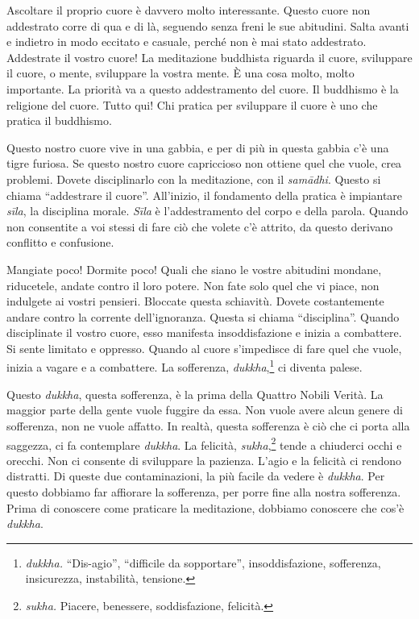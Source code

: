 Ascoltare il proprio cuore è davvero molto interessante. Questo cuore
non addestrato corre di qua e di là, seguendo senza freni le sue
abitudini. Salta avanti e indietro in modo eccitato e casuale, perché
non è mai stato addestrato. Addestrate il vostro cuore! La meditazione
buddhista riguarda il cuore, sviluppare il cuore, o mente, sviluppare la
vostra mente. È una cosa molto, molto importante. La priorità va a
questo addestramento del cuore. Il buddhismo è la religione del cuore.
Tutto qui! Chi pratica per sviluppare il cuore è uno che pratica il
buddhismo.

Questo nostro cuore vive in una gabbia, e per di più in questa gabbia
c'è una tigre furiosa. Se questo nostro cuore capriccioso non ottiene
quel che vuole, crea problemi. Dovete disciplinarlo con la meditazione,
con il \emph{samādhi}. Questo si chiama ``addestrare il cuore''.
All'inizio, il fondamento della pratica è impiantare \emph{sīla}, la
disciplina morale. \emph{Sīla} è l'addestramento del corpo e della
parola. Quando non consentite a voi stessi di fare ciò che volete c'è
attrito, da questo derivano conflitto e confusione.

Mangiate poco! Dormite poco! Quali che siano le vostre abitudini
mondane, riducetele, andate contro il loro potere. Non fate solo quel
che vi piace, non indulgete ai vostri pensieri. Bloccate questa
schiavitù. Dovete costantemente andare contro la corrente
dell'ignoranza. Questa si chiama ``disciplina''. Quando disciplinate il
vostro cuore, esso manifesta insoddisfazione e inizia a combattere. Si
sente limitato e oppresso. Quando al cuore s'impedisce di fare quel che
vuole, inizia a vagare e a combattere. La sofferenza,
\emph{dukkha},\footnote{\emph{dukkha.} ``Dis-agio'', ``difficile da
  sopportare'', insoddisfazione, sofferenza, insicurezza, instabilità,
  tensione.} ci diventa palese.

Questo \emph{dukkha}, questa sofferenza, è la prima della Quattro Nobili
Verità. La maggior parte della gente vuole fuggire da essa. Non vuole
avere alcun genere di sofferenza, non ne vuole affatto. In realtà,
questa sofferenza è ciò che ci porta alla saggezza, ci fa contemplare
\emph{dukkha}. La felicità, \emph{sukha},\footnote{\emph{sukha.}
  Piacere, benessere, soddisfazione, felicità.} tende a chiuderci occhi
e orecchi. Non ci consente di sviluppare la pazienza. L'agio e la
felicità ci rendono distratti. Di queste due contaminazioni, la più
facile da vedere è \emph{dukkha}. Per questo dobbiamo far affiorare la
sofferenza, per porre fine alla nostra sofferenza. Prima di conoscere
come praticare la meditazione, dobbiamo conoscere che cos'è
\emph{dukkha}.

